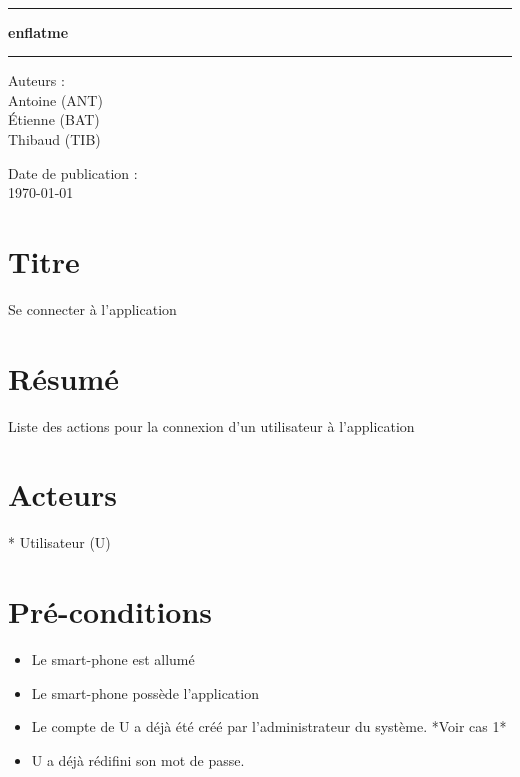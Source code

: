 \documentclass[a4paper, 12pt, french]{article}
\newcommand{\nomProjet}{enflatme\xspace}
\begin{document}
	\begin{titlepage}
		\begin{center}
			\LARGE{} \\
		    \rule{\linewidth}{1.5pt}
		    \huge{\textbf{\nomProjet}}
		    \rule{\linewidth}{1.5pt} \newline{} \newline{}
		\end{center}
		\begin{center}
		    \large{Auteurs :}\\ Antoine  (ANT)\\ Étienne  (BAT) \\ Thibaud  (TIB)
		\end{center}
		\vspace{50px}
		\begin{center}
			\large{Date de publication :}\\ \today
		\end{center}
	\end{titlepage}
	\newpage


\section{Titre}
Se connecter à l'application

\section{Résumé }
Liste des actions pour la connexion d'un utilisateur à l'application 

\section{Acteurs}
* Utilisateur (U)

\section{Pré-conditions}

\begin{itemize}
	\item Le smart-phone est allumé
	\item Le smart-phone possède l'application
	\item Le compte de U a déjà été créé par l'administrateur du système. *Voir cas 1*
	\item U a déjà rédifini son mot de passe.
\end{itemize}
\end{document}
